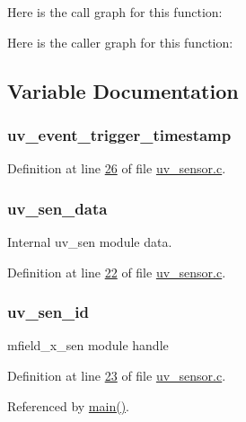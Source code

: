 Here is the call graph for this function\+:




Here is the caller graph for this function\+:




\subsection{Variable Documentation}
\hypertarget{a00073_a4e8cc59a7a6d147cfe43b64ce2f44e7a}{
\subsubsection[{uv\+\_\+event\+\_\+trigger\+\_\+timestamp}]{ uv\+\_\+event\+\_\+trigger\+\_\+timestamp}}\label{a00073_a4e8cc59a7a6d147cfe43b64ce2f44e7a}


Definition at line \hyperlink{a00073_source_l00026}{26} of file \hyperlink{a00073_source}{uv\+\_\+sensor.\+c}.

\hypertarget{a00073_adb4cffe9b88704fe686a94fe9996fa52}{
\subsubsection[{uv\+\_\+sen\+\_\+data}]{ uv\+\_\+sen\+\_\+data}}\label{a00073_adb4cffe9b88704fe686a94fe9996fa52}


Internal uv\+\_\+sen module data. 



Definition at line \hyperlink{a00073_source_l00022}{22} of file \hyperlink{a00073_source}{uv\+\_\+sensor.\+c}.

\hypertarget{a00073_afd789f3f9ea182d28d4f16db0d8d5652}{
\subsubsection[{uv\+\_\+sen\+\_\+id}]{ uv\+\_\+sen\+\_\+id}}\label{a00073_afd789f3f9ea182d28d4f16db0d8d5652}


mfield\+\_\+x\+\_\+sen module handle 



Definition at line \hyperlink{a00073_source_l00023}{23} of file \hyperlink{a00073_source}{uv\+\_\+sensor.\+c}.



Referenced by \hyperlink{a00048_source_l00080}{main()}.

